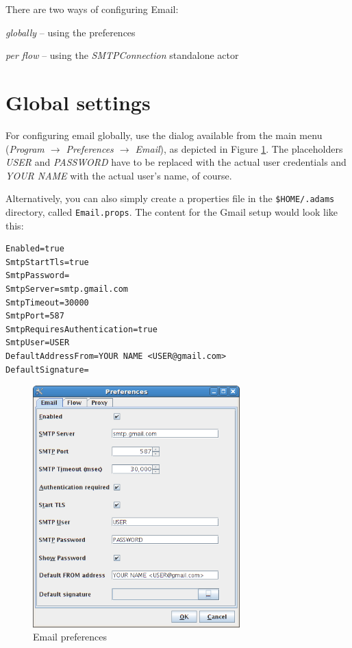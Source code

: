 \documentclass[a4paper]{book}
\begin{document}
There are two ways of configuring Email:
\begin{tight_itemize}
	\item \textit{globally} -- using the preferences
	\item \textit{per flow} -- using the \textit{SMTPConnection} standalone actor
\end{tight_itemize}

\section{Global settings}
For configuring email globally, use the dialog available from the main
menu (\textit{Program $\rightarrow$ Preferences $\rightarrow$ Email}), as depicted in Figure
\ref{email_setup}. The placeholders \textit{USER} and \textit{PASSWORD} have to
be replaced with the actual user credentials and \textit{YOUR NAME} with the
actual user's name, of course.

Alternatively, you can also simply create a properties file in the
\texttt{\$HOME/.adams} directory, called \texttt{Email.props}. The content for
the Gmail setup would look like this:

\begin{verbatim}
Enabled=true
SmtpStartTls=true
SmtpPassword=
SmtpServer=smtp.gmail.com
SmtpTimeout=30000
SmtpPort=587
SmtpRequiresAuthentication=true
SmtpUser=USER
DefaultAddressFrom=YOUR NAME <USER@gmail.com>
DefaultSignature=
\end{verbatim}

\begin{figure}[htb]
  \centering
  \includegraphics[width=8.0cm]{images/email_setup.png}
  \caption{Email preferences}
  \label{email_setup}
\end{figure}
\end{document}
